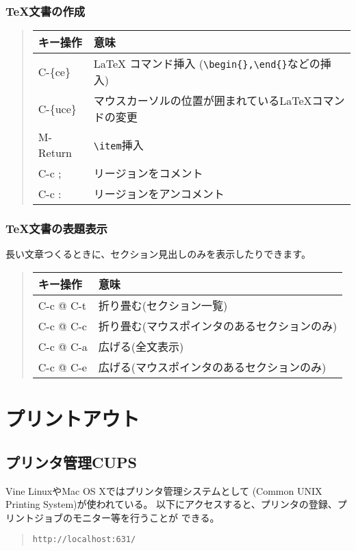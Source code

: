 \documentclass{jreport}
\begin{document}
\subsection{TeX文書の作成}

\begin{quote}
\begin{tabular}[t]{ll}\hline
キー操作 & 意味 \\ \hline
C-\{ce\} & LaTeX コマンド挿入 (\verb|\begin{},\end{}|などの挿入)\\
C-\{uce\} & マウスカーソルの位置が囲まれているLaTeXコマンドの変更 \\
M-Return & \verb|\item|挿入 \\
C-c ; & リージョンをコメント \\
C-c : & リージョンをアンコメント \\
\hline
\end{tabular}
\end{quote}

\subsection{TeX文書の表題表示}
長い文章つくるときに、セクション見出しのみを表示したりできます。

\begin{quote}
\begin{tabular}[t]{ll}\hline
キー操作 & 意味 \\ \hline
C-c @ C-t & 折り畳む(セクション一覧)\\
C-c @ C-c & 折り畳む(マウスポインタのあるセクションのみ)\\
C-c @ C-a  & 広げる(全文表示)\\
C-c @ C-e  & 広げる(マウスポインタのあるセクションのみ)\\
\hline
\end{tabular}
\end{quote}

\chapter{プリントアウト}

\section{プリンタ管理CUPS\label{sec:cups}}

Vine LinuxやMac OS Xではプリンタ管理システムとして
(Common UNIX Printing System)が使われている。
以下にアクセスすると、プリンタの登録、プリントジョブのモニター等を行うことが
できる。
\begin{quote}
\begin{verbatim}
http://localhost:631/
\end{verbatim}
\end{quote}
\end{document}
